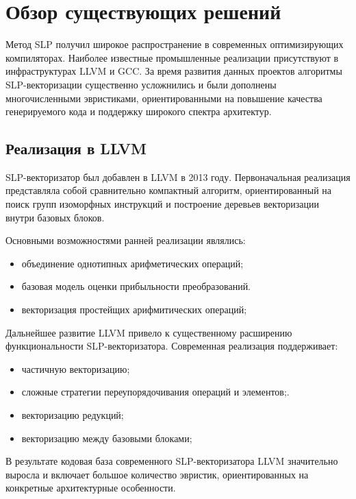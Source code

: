 \section{Обзор существующих решений}
\label{sec:Chapter3} 

Метод SLP получил широкое распространение в современных оптимизирующих компиляторах. 
Наиболее известные промышленные реализации присутствуют в инфраструктурах LLVM и GCC.
За время развития данных проектов алгоритмы SLP-векторизации существенно усложнились и были дополнены многочисленными эвристиками,
ориентированными на повышение качества генерируемого кода и поддержку широкого спектра архитектур.

\subsection{Реализация в LLVM}

SLP-векторизатор был добавлен в LLVM в 2013 году.
Первоначальная реализация представляла собой сравнительно компактный алгоритм,
ориентированный на поиск групп изоморфных инструкций и построение деревьев векторизации внутри базовых блоков.

Основными возможностями ранней реализации являлись:
\begin{itemize}
    \item объединение однотипных арифметических операций;
    \item базовая модель оценки прибыльности преобразований.
    \item векторизация простейщих арифмитических операций;
\end{itemize}

Дальнейшее развитие LLVM привело к существенному расширению функциональности SLP-векторизатора. Современная реализация поддерживает:
\begin{itemize}
    \item частичную векторизацию;
    \item сложные стратегии переупорядочивания операций и элементов;.
    \item векторизацию редукций;
    \item векторизацию между базовыми блоками;
\end{itemize}

В результате кодовая база современного SLP-векторизатора LLVM значительно выросла и включает большое количество эвристик,
ориентированных на конкретные архитектурные особенности.

